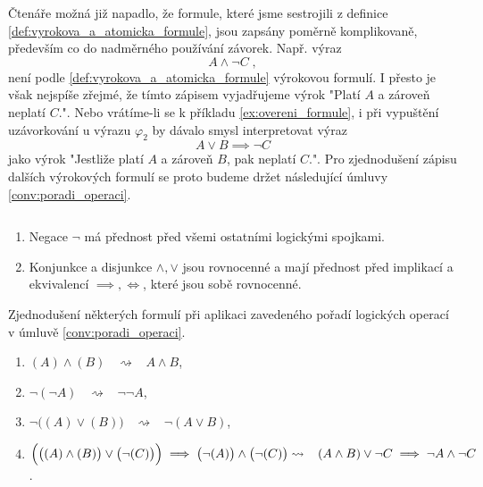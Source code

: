Čtenáře možná již napadlo, že formule, které jsme sestrojili z definice \ref{def:vyrokova_a_atomicka_formule}, jsou zapsány poměrně komplikovaně, především co do nadměrného používání závorek. Např. výraz
\begin{equation}\label{eq:poradi_operaci}
    A \land \neg C\; ,
\end{equation}
není podle \ref{def:vyrokova_a_atomicka_formule} výrokovou formulí. I přesto je však nejspíše zřejmé, že tímto zápisem vyjadřujeme výrok "Platí $A$ a zároveň neplatí $C$.". Nebo vrátíme-li se k příkladu \ref{ex:overeni_formule}, i při vypuštění uzávorkování u výrazu $\varphi_2$ by dávalo smysl interpretovat výraz
\begin{equation*}\label{eq:vypusteni_uzavorkovani}
    A \lor B \implies \neg C
\end{equation*}
jako výrok "Jestliže platí $A$ a zároveň $B$, pak neplatí $C$.". Pro zjednodušení zápisu dalších výrokových formulí se proto budeme držet následující úmluvy \ref{conv:poradi_operaci}.
\begin{convention}
    \label{conv:poradi_operaci}
    $ $\par
    \begin{enumerate}[label=(\arabic*)]
        \item Negace $\neg$ má přednost před všemi ostatními logickými spojkami.
        \item Konjunkce a disjunkce $\land,\lor$ jsou rovnocenné a mají přednost před implikací a ekvivalencí $\implies,\iff$, které jsou sobě rovnocenné.
    \end{enumerate}
\end{convention}

\begin{example}
    Zjednodušení některých formulí při aplikaci zavedeného pořadí logických operací v úmluvě \ref{conv:poradi_operaci}.
    \begin{enumerate}[label=(\roman*)]
        \item $(A) \land (B)\;\;\;\rightsquigarrow\;\;\; A \land B$,
        \item $\neg(\neg A)\;\;\;\rightsquigarrow\;\;\; \neg\neg A$,
        \item $\neg \big((A) \lor (B)\big)\;\;\; \rightsquigarrow\;\;\; \neg(A \lor B)$,
        \item $\Big(\big((A) \land (B)\big) \lor \big(\neg (C)\big)\Big) \implies \big(\neg (A)\big) \land \big(\neg (C)\big)\\ \rightsquigarrow\;\;\;(A \land B) \lor \neg C \implies \neg A \land \neg C$.
    \end{enumerate}
\end{example}

